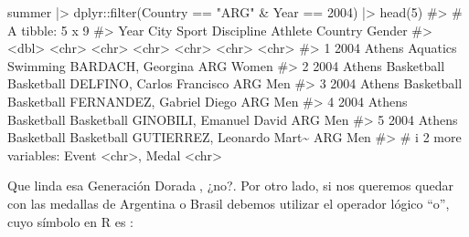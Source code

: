 \documentclass[
  letterpaper,
  DIV=11,
  numbers=noendperiod,
  oneside]{scrreprt}
\newenvironment{Shaded}{\begin{snugshade}}{\end{snugshade}}
\newcommand{\CommentTok}[1]{\textcolor[rgb]{0.37,0.37,0.37}{#1}}
\newcommand{\DecValTok}[1]{\textcolor[rgb]{0.68,0.00,0.00}{#1}}
\newcommand{\FunctionTok}[1]{\textcolor[rgb]{0.28,0.35,0.67}{#1}}
\newcommand{\NormalTok}[1]{\textcolor[rgb]{0.00,0.23,0.31}{#1}}
\newcommand{\SpecialCharTok}[1]{\textcolor[rgb]{0.37,0.37,0.37}{#1}}
\newcommand{\StringTok}[1]{\textcolor[rgb]{0.13,0.47,0.30}{#1}}
\begin{document}
\begin{Shaded}
\begin{Highlighting}[]
\NormalTok{summer }\SpecialCharTok{|\textgreater{}}\NormalTok{ dplyr}\SpecialCharTok{::}\FunctionTok{filter}\NormalTok{(Country }\SpecialCharTok{==} \StringTok{"ARG"} \SpecialCharTok{\&}\NormalTok{ Year }\SpecialCharTok{==} \DecValTok{2004}\NormalTok{) }\SpecialCharTok{|\textgreater{}} \FunctionTok{head}\NormalTok{(}\DecValTok{5}\NormalTok{)}
\CommentTok{\#\textgreater{} \# A tibble: 5 x 9}
\CommentTok{\#\textgreater{}    Year City   Sport      Discipline Athlete                   Country Gender}
\CommentTok{\#\textgreater{}   \textless{}dbl\textgreater{} \textless{}chr\textgreater{}  \textless{}chr\textgreater{}      \textless{}chr\textgreater{}      \textless{}chr\textgreater{}                     \textless{}chr\textgreater{}   \textless{}chr\textgreater{} }
\CommentTok{\#\textgreater{} 1  2004 Athens Aquatics   Swimming   BARDACH, Georgina         ARG     Women }
\CommentTok{\#\textgreater{} 2  2004 Athens Basketball Basketball DELFINO, Carlos Francisco ARG     Men   }
\CommentTok{\#\textgreater{} 3  2004 Athens Basketball Basketball FERNANDEZ, Gabriel Diego  ARG     Men   }
\CommentTok{\#\textgreater{} 4  2004 Athens Basketball Basketball GINOBILI, Emanuel David   ARG     Men   }
\CommentTok{\#\textgreater{} 5  2004 Athens Basketball Basketball GUTIERREZ, Leonardo Mart\textasciitilde{} ARG     Men   }
\CommentTok{\#\textgreater{} \# i 2 more variables: Event \textless{}chr\textgreater{}, Medal \textless{}chr\textgreater{}}
\end{Highlighting}
\end{Shaded}

Que linda esa Generación Dorada🏅, ¿no?. Por otro lado, si nos queremos
quedar con las medallas de Argentina o Brasil debemos utilizar el
operador lógico ``o'', cuyo símbolo en R es \texttt{\textbar{}}:
\end{document}
